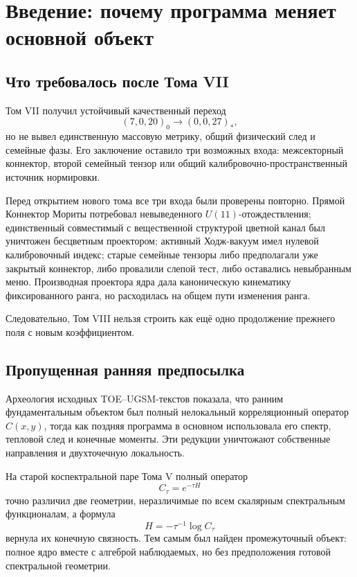 \chapter{Введение: почему программа меняет основной объект}
\label{ch:v8-introduction-and-problem-statement}

\section{Что требовалось после Тома VII}

Том VII получил устойчивый качественный переход
\begin{equation}
 (7,0,20)_0\longrightarrow(0,0,27)_*,
\end{equation}
но не вывел единственную массовую метрику, общий физический след и семейные
фазы. Его заключение оставило три возможных входа: межсекторный коннектор,
второй семейный тензор или общий калибровочно-пространственный источник нормировки.

Перед открытием нового тома все три входа были проверены повторно. Прямой
Коннектор Мориты потребовал невыведенного $U(11)$-отождествления; единственный
совместимый с вещественной структурой цветной канал был уничтожен бесцветным проектором; активный
Ходж-вакуум имел нулевой калибровочный индекс; старые семейные тензоры либо
предполагали уже закрытый коннектор, либо провалили слепой тест, либо
оставались невыбранным меню. Производная проектора ядра дала каноническую
кинематику фиксированного ранга, но расходилась на общем пути изменения ранга.

Следовательно, Том VIII нельзя строить как ещё одно продолжение прежнего
поля с новым коэффициентом.

\section{Пропущенная ранняя предпосылка}

Археология исходных TOE--UGSM-текстов показала, что ранним фундаментальным
объектом был полный нелокальный корреляционный оператор $C(x,y)$, тогда как
поздняя программа в основном использовала его спектр, тепловой след и
конечные моменты. Эти редукции уничтожают собственные направления и
двухточечную локальность.

На старой коспектральной паре Тома V полный оператор
\begin{equation}
 C_\tau=e^{-\tau H}
\end{equation}
точно различил две геометрии, неразличимые по всем скалярным спектральным
функционалам, а формула
\begin{equation}
 H=-\tau^{-1}\log C_\tau
\end{equation}
вернула их конечную связность. Тем самым был найден промежуточный объект:
полное ядро вместе с алгеброй наблюдаемых, но без предположения готовой
спектральной геометрии.


